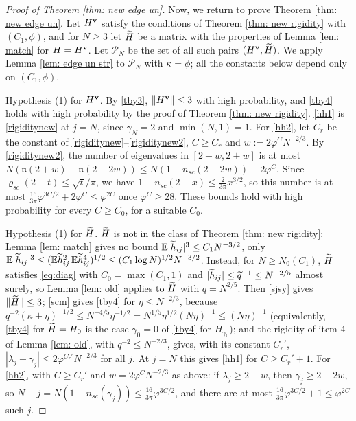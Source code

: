 \begin{proof}[Proof of Theorem \ref{thm: new edge un}]
Now, we return to prove Theorem \ref{thm: new edge un}. Let $H^{\mathbf{v}}$ satisfy the conditions of Theorem \ref{thm: new rigidity} with $(C_1,\phi)$, and for $N\ge3$ let $\widetilde H$ be a matrix with the properties of Lemma \ref{lem: match} for $H=H^{\mathbf{v}}$. Let ${\mathcal P}_N$ be the set of all such pairs $(H^{\mathbf{v}},\widetilde H)$. We apply Lemma \ref{lem: edge un str} to ${\mathcal P}_N$ with $\kappa=\phi$; all the constants below depend only on $(C_1,\phi)$.

Hypothesis (1) for $H^{\mathbf{v}}$. By \eqref{tby3}, $\|H^{\mathbf{v}}\|\le3$ with high probability, and \eqref{tby4} holds with high probability by the proof of Theorem \ref{thm: new rigidity}. \eqref{hh1} is \eqref{rigiditynew} at $j=N$, since $\gamma_N=2$ and $\min(N,1)=1$. For \eqref{hh2}, let $C_r$ be the constant of \eqref{rigiditynew}--\eqref{rigiditynew2}, $C\ge C_r$ and $w:=2\varphi^CN^{-2/3}$. By \eqref{rigiditynew2}, the number of eigenvalues in $[2-w,2+w]$ is at most $N(\mathfrak n(2+w)-\mathfrak n(2-2w))\le N(1-n_{sc}(2-2w))+2\varphi^{C}$. Since $\varrho_{sc}(2-t)\le\sqrt t/\pi$, we have $1-n_{sc}(2-x)\le\frac{2}{3\pi}x^{3/2}$, so this number is at most $\frac{16}{3\pi}\varphi^{3C/2}+2\varphi^C\le\varphi^{2C}$ once $\varphi^C\ge28$. These bounds hold with high probability for every $C\ge C_0$, for a suitable $C_0$.

Hypothesis (1) for $\widetilde H$. $\widetilde H$ is not in the class of Theorem \ref{thm: new rigidity}: Lemma \ref{lem: match} gives no bound $\mathbb{E}|\widetilde h_{ij}|^3\le C_1N^{-3/2}$, only $\mathbb{E}|\widetilde h_{ij}|^3\le(\mathbb{E}\widetilde h_{ij}^2\,\mathbb{E}\widetilde h_{ij}^4)^{1/2}\le(C_1\log N)^{1/2}N^{-3/2}$. Instead, for $N\ge N_0(C_1)$, $\widetilde H$ satisfies \eqref{eq:diag} with $C_0=\max(C_1,1)$ and $|\widetilde h_{ij}|\le\widetilde q^{-1}\le N^{-2/5}$ almost surely, so Lemma \ref{lem: old} applies to $\widetilde H$ with $q=N^{2/5}$. Then \eqref{sjsy} gives $\|\widetilde H\|\le3$; \eqref{scm} gives \eqref{tby4} for $\eta\le N^{-2/3}$, because $q^{-2}(\kappa+\eta)^{-1/2}\le N^{-4/5}\eta^{-1/2}=N^{1/5}\eta^{1/2}(N\eta)^{-1}\le(N\eta)^{-1}$ (equivalently, \eqref{tby4} for $\widetilde H=H_0$ is the case $\gamma_0=0$ of \eqref{tby4} for $H_{\gamma_0}$); and the rigidity of item 4 of Lemma \ref{lem: old}, with $q^{-2}\le N^{-2/3}$, gives, with its constant $C_r'$, $|\lambda_j-\gamma_j|\le2\varphi^{C_r'}N^{-2/3}$ for all $j$. At $j=N$ this gives \eqref{hh1} for $C\ge C_r'+1$. For \eqref{hh2}, with $C\ge C_r'$ and $w=2\varphi^CN^{-2/3}$ as above: if $\lambda_j\ge2-w$, then $\gamma_j\ge2-2w$, so $N-j=N(1-n_{sc}(\gamma_j))\le\frac{16}{3\pi}\varphi^{3C/2}$, and there are at most $\frac{16}{3\pi}\varphi^{3C/2}+1\le\varphi^{2C}$ such $j$.


\end{proof}
